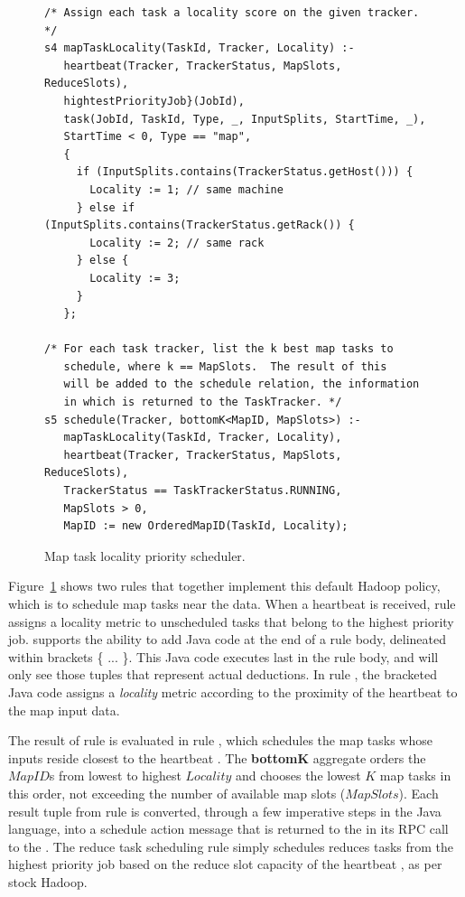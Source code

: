\begin{figure}
\ssp
\centering
\begin{lstlisting}
/* Assign each task a locality score on the given tracker. */
s4 mapTaskLocality(TaskId, Tracker, Locality) :-
   heartbeat(Tracker, TrackerStatus, MapSlots, ReduceSlots),
   hightestPriorityJob}(JobId),
   task(JobId, TaskId, Type, _, InputSplits, StartTime, _),
   StartTime < 0, Type == "map",
   {
     if (InputSplits.contains(TrackerStatus.getHost())) { 
       Locality := 1; // same machine
     } else if (InputSplits.contains(TrackerStatus.getRack()) { 
       Locality := 2; // same rack
     } else {
       Locality := 3;
     }
   };
	
/* For each task tracker, list the k best map tasks to 
   schedule, where k == MapSlots.  The result of this 
   will be added to the schedule relation, the information 
   in which is returned to the TaskTracker. */
s5 schedule(Tracker, bottomK<MapID, MapSlots>) :-
   mapTaskLocality(TaskId, Tracker, Locality),
   heartbeat(Tracker, TrackerStatus, MapSlots, ReduceSlots),
   TrackerStatus == TaskTrackerStatus.RUNNING,
   MapSlots > 0,
   MapID := new OrderedMapID(TaskId, Locality);

\end{lstlisting}
\caption{\label{ch:boom:fig:schedule} Map task locality priority scheduler.}
\end{figure}

Figure~\ref{ch:boom:fig:schedule} shows two rules that together implement this
default Hadoop policy, which is to schedule map tasks near the data.  When a \TT
heartbeat is received, rule  assigns a locality metric to unscheduled
tasks that belong to the highest priority job.  \JOL supports the ability to
add Java code at the end of a rule body, delineated within brackets \{ ...  \}.
This Java code executes last in the rule body, and will only see those tuples
that represent actual deductions.  In rule , the bracketed Java code
assigns a {\em locality} metric according to the proximity of the heartbeat \TT to
the map input data.

The result of rule  is evaluated in rule , which schedules the
map tasks whose inputs reside closest to the heartbeat \TT.  The {\bf bottomK}
aggregate orders the $MapID$s from lowest to highest $Locality$ and chooses the
lowest $K$ map tasks in this order, not exceeding the number of available map slots
($MapSlots$).  Each result tuple from rule  is converted, through a few
imperative steps in the Java language, into a schedule action message that is
returned to the \TT in its RPC call to the \JT.  The reduce task scheduling
rule simply schedules reduces tasks from the highest priority job based on the
reduce slot capacity of the heartbeat \TT, as per stock Hadoop.

